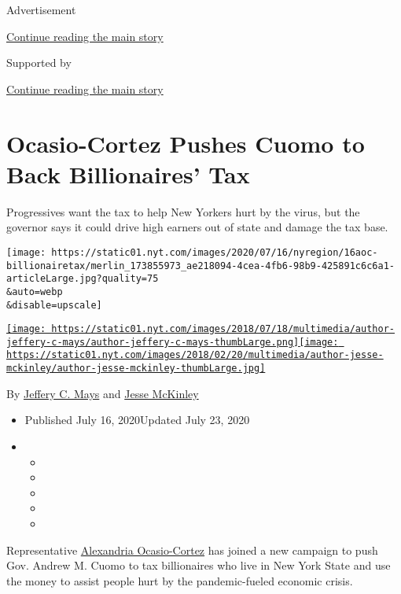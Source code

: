 Advertisement

\protect\hyperlink{after-top}{Continue reading the main story}

Supported by

\protect\hyperlink{after-sponsor}{Continue reading the main story}

\hypertarget{ocasio-cortez-pushes-cuomo-to-back-billionaires-tax}{%
\section{Ocasio-Cortez Pushes Cuomo to Back Billionaires'
Tax}\label{ocasio-cortez-pushes-cuomo-to-back-billionaires-tax}}

Progressives want the tax to help New Yorkers hurt by the virus, but the
governor says it could drive high earners out of state and damage the
tax base.

\texttt{[image: https://static01.nyt.com/images/2020/07/16/nyregion/16aoc-billionairetax/merlin\_173855973\_ae218094-4cea-4fb6-98b9-425891c6c6a1-articleLarge.jpg?quality=75\\\&auto=webp\\\&disable=upscale]}

\href{https://www.nytimes.com/by/jeffery-c-mays}{\texttt{[image: https://static01.nyt.com/images/2018/07/18/multimedia/author-jeffery-c-mays/author-jeffery-c-mays-thumbLarge.png]}}\href{https://www.nytimes.com/by/jesse-mckinley}{\texttt{[image: https://static01.nyt.com/images/2018/02/20/multimedia/author-jesse-mckinley/author-jesse-mckinley-thumbLarge.jpg]}}

By \href{https://www.nytimes.com/by/jeffery-c-mays}{Jeffery C. Mays} and
\href{https://www.nytimes.com/by/jesse-mckinley}{Jesse McKinley}

\begin{itemize}
\item
  Published July 16, 2020Updated July 23, 2020
\item
  \begin{itemize}
  \item
  \item
  \item
  \item
  \item
  \end{itemize}
\end{itemize}

Representative
\href{https://www.nytimes.com/2020/07/23/us/alexandria-ocasio-cortez-sexism-congress.html}{Alexandria
Ocasio-Cortez} has joined a new campaign to push Gov. Andrew M. Cuomo to
tax billionaires who live in New York State and use the money to assist
people hurt by the pandemic-fueled economic crisis.


